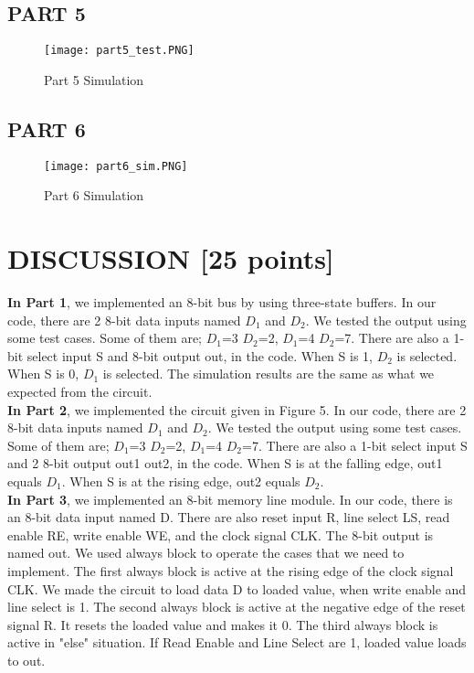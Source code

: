 \documentclass[pdftex,12pt,a4paper]{article}
\begin{document}
\subsection{PART 5}
\begin{figure}[hbt!]
	\centering
	\texttt{[image: part5\_test.PNG]}	
	\caption{Part 5 Simulation}
	\label{fig1}
\end{figure}


\subsection{PART 6}
\begin{figure}[hbt!]
	\centering
	\texttt{[image: part6\_sim.PNG]}	
	\caption{Part 6 Simulation}
	\label{fig1}
\end{figure}

\clearpage

\section{DISCUSSION [25 points]}
\textbf{In Part 1}, we implemented an 8-bit bus by using three-state buffers. In our code, there are 2 8-bit data inputs named  \(D_1\) and \(D_2\). We tested the output using some test cases. Some of them are; \(D_1\)=3 \(D_2\)=2, \(D_1\)=4 \(D_2\)=7. There are also a 1-bit select input S and 8-bit output out, in the code. When S is 1,  \(D_2\) is selected. When S is 0,  \(D_1\) is selected. The simulation results are the same as what we expected from the circuit.\\

\textbf{In Part 2},  we implemented the circuit given in Figure 5. In our code, there are 2 8-bit data inputs named  \(D_1\) and \(D_2\). We tested the output using some test cases. Some of them are; \(D_1\)=3 \(D_2\)=2, \(D_1\)=4 \(D_2\)=7. There are also a 1-bit select input S and 2 8-bit output out1 out2, in the code. When S is at the falling edge, out1 equals \(D_1\). When S is at the rising edge, out2 equals \(D_2\).\\

\textbf{In Part 3}, we implemented an 8-bit memory line module. In our code, there is an 8-bit data input named D. There are also reset input R, line select LS, read enable RE, write enable WE, and the clock signal CLK. The 8-bit output is named out. We used always block to operate the cases that we need to implement. The first always block is active at the rising edge of the clock signal CLK. We made the circuit to load data D to loaded value, when write enable and line select is 1. The second always block is active at the negative edge of the reset signal R. It resets the loaded value and makes it 0. The third always block is active in "else" situation. If Read Enable and Line Select are 1, loaded value loads to out.\\
\end{document}
